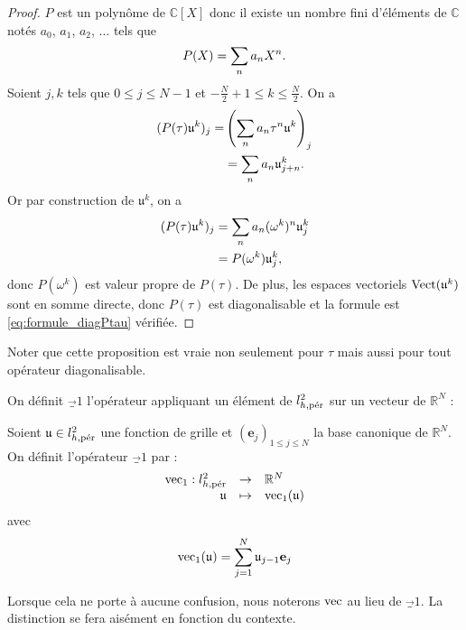 \begin{proof}
$P$ est un polynôme de $\mathbb{C}[X]$ donc il existe un nombre fini d'éléments de $\mathbb{C}$ notés $a_0$, $a_1$, $a_2$, ... tels que
\begin{equation}
P(X) = \gsum_{n} a_n X^n.
\end{equation}
Soient $j, k$ tels que $0 \leq j \leq N-1$ et $-\frac{N}{2}+1 \leq k \leq \frac{N}{2}$. On a
\begin{align*}
(P(\tau)\mathfrak{u}^k)_j = & \left( \gsum_{n} a_n \tau^n \mathfrak{u}^k  \right)_j\\
	& = \gsum_n a_n \mathfrak{u}^k_{j+n}.
	\end{align*}
Or par construction de $\mathfrak{u}^k$, on a
\begin{align*}	
(P(\tau)\mathfrak{u}^k)_j & = \gsum_{n} a_n (\omega^k)^n \mathfrak{u}_j^k \\
	& = P(\omega^k) \mathfrak{u}_j^k,
\end{align*}
donc $P(\omega^k)$ est valeur propre de $P(\tau)$.
De plus, les espaces vectoriels $\Vect (\mathfrak{u}^k)$ sont en somme directe, donc $P(\tau)$ est diagonalisable et la formule  est \eqref{eq:formule_diagPtau} vérifiée.
\end{proof}

\begin{remarque}
Noter que cette proposition est vraie non seulement pour $\tau$ mais aussi pour tout opérateur diagonalisable.
\end{remarque}

On définit $\vec_1$ l'opérateur appliquant un élément de $l_{h,\per}^2$ sur un vecteur de $\mathbb{R}^N$ :

\begin{definition}
Soient $\mathfrak{u} \in l^2_{h,\per}$ une fonction de grille et $(\mathbf{e}_j)_{1 \leq j \leq N}$ la base canonique de $\mathbb{R}^N$. On définit l'opérateur $\vec_1$ par :
\begin{equation}
\begin{array}{rcl}
\vec_1 : l^2_{h,\per} & \rightarrow & \mathbb{R}^N \\
         \mathfrak{u} & \mapsto & \vec_1 ( \mathfrak{u} )
\end{array}
\end{equation}
avec 
\begin{equation}
\vec_1 (\mathfrak{u} ) = \gsum_{j=1}^N \mathfrak{u}_{j-1} \mathbf{e}_j
\end{equation}
\end{definition}
Lorsque cela ne porte à aucune confusion, nous noterons $\vec$ au lieu de $\vec_1$. La distinction se fera aisément en fonction du contexte.

